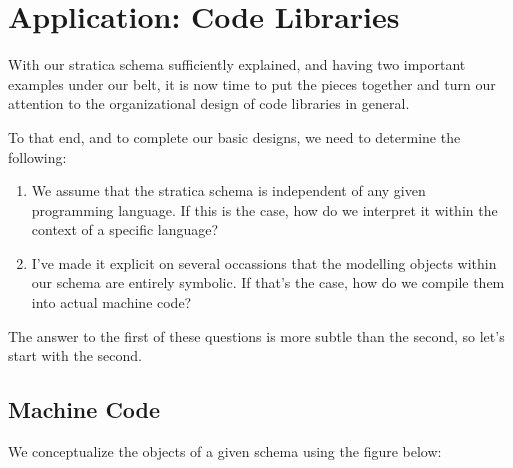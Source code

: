 \documentclass[twoside]{article}
\begin{document}
\section*{Application: Code Libraries}

With our stratica schema sufficiently explained, and having two important examples under our belt, it is now time to put
the pieces together and turn our attention to the organizational design of code libraries in general.

To that end, and to complete our basic designs, we need to determine the following:

\begin{enumerate}
\item We assume that the stratica schema is independent of any given programming language. If this is the case, how do we
      interpret it within the context of a specific language?
\item I've made it explicit on several occassions that the modelling objects within our schema are entirely symbolic.
      If that's the case, how do we compile them into actual machine code?
\end{enumerate}

The answer to the first of these questions is more subtle than the second, so let's start with the second.

\subsection*{Machine Code}

We conceptualize the objects of a given schema using the figure below:
\end{document}
